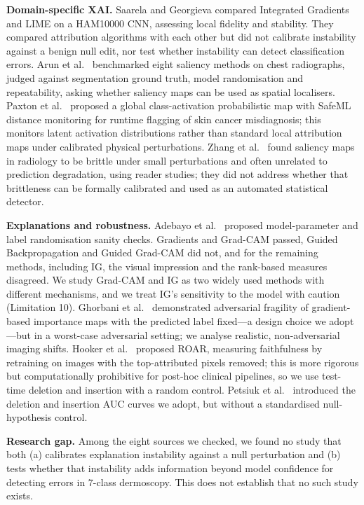 \documentclass[conference]{IEEEtran}
\begin{document}
\textbf{Domain-specific XAI.} Saarela and Georgieva \cite{saarela2022}
compared Integrated Gradients and LIME on a HAM10000 CNN, assessing local
fidelity and stability. They compared attribution algorithms with each
other but did not calibrate instability against a benign null edit, nor
test whether instability can detect classification errors. Arun et
al.\ \cite{arun2021} benchmarked eight saliency methods on chest radiographs,
judged against segmentation ground truth, model randomisation and repeatability,
asking whether saliency maps can be used as spatial localisers. Paxton et
al.\ \cite{paxton2025} proposed a global class-activation probabilistic map
with SafeML distance monitoring for runtime flagging of skin cancer
misdiagnosis; this monitors latent activation distributions rather than
standard local attribution maps under calibrated physical perturbations.
Zhang et al.\ \cite{zhang2024} found saliency maps in radiology to be
brittle under small perturbations and often unrelated to prediction
degradation, using reader studies; they did not address whether that
brittleness can be formally calibrated and used as an automated statistical
detector.

\textbf{Explanations and robustness.} Adebayo et al.\ \cite{adebayo2018}
proposed model-parameter and label randomisation sanity checks. Gradients and
Grad-CAM passed, Guided Backpropagation and Guided Grad-CAM did not, and for
the remaining methods, including IG, the visual impression and the rank-based
measures disagreed. We study Grad-CAM and IG as two widely used methods with
different mechanisms, and we treat IG's sensitivity to the model with caution
(Limitation 10). Ghorbani et
al.\ \cite{ghorbani2019} demonstrated adversarial fragility of
gradient-based importance maps with the predicted label fixed---a
design choice we adopt---but in a worst-case adversarial setting; we analyse
realistic, non-adversarial imaging shifts. Hooker et
al.\ \cite{hooker2019} proposed ROAR, measuring faithfulness by retraining
on images with the top-attributed pixels removed; this is more rigorous but
computationally prohibitive for post-hoc clinical pipelines, so we use
test-time deletion and insertion with a random control. Petsiuk et
al.\ \cite{petsiuk2018} introduced the deletion and insertion AUC curves we
adopt, but without a standardised null-hypothesis control.

\textbf{Research gap.} Among the eight sources we checked, we found no study
that both (a) calibrates explanation instability against a null
perturbation and (b) tests whether that instability adds information beyond
model confidence for detecting errors in 7-class dermoscopy. This does not
establish that no such study exists.
\end{document}
